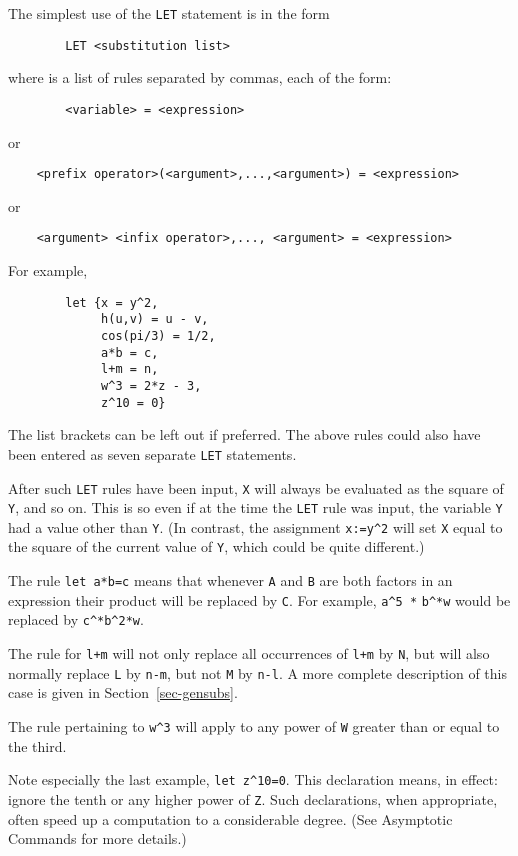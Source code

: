 The simplest use of the {\tt LET} statement is in the form
\begin{verbatim}
        LET <substitution list>
\end{verbatim}
where {\tt <substitution list>} is a list of rules separated by commas, each
of the form:
\begin{verbatim}
        <variable> = <expression>
\end{verbatim}
or
\begin{verbatim}
    <prefix operator>(<argument>,...,<argument>) = <expression>
\end{verbatim}
or
\begin{verbatim}
    <argument> <infix operator>,..., <argument> = <expression>
\end{verbatim}
For example,
\begin{verbatim}
        let {x = y^2,
             h(u,v) = u - v,
             cos(pi/3) = 1/2,
             a*b = c,
             l+m = n,
             w^3 = 2*z - 3,
             z^10 = 0}
\end{verbatim}
The list brackets can be left out if preferred.  The above rules could
also have been entered as seven separate {\tt LET} statements.

After such {\tt LET} rules have been input, {\tt X} will always be
evaluated as the square of {\tt Y}, and so on.  This is so even if at the
time the {\tt LET} rule was input, the variable {\tt Y} had a value other
than {\tt Y}. (In contrast, the assignment {\tt x:=y\^{ }2} will set {\tt X}
equal to the square of the current value of {\tt Y}, which could be quite
different.)

The rule {\tt let a*b=c} means that whenever {\tt A} and {\tt B} are both
factors in an expression their product will be replaced by {\tt C}.  For
example, {\tt a\^{ }5 *} {\tt b\^{ }*w} would be replaced by
{\tt c\^{ }*b\^{ }2*w}.

The rule for {\tt l+m} will not only replace all occurrences of {\tt l+m}
by {\tt N}, but will also normally replace {\tt L} by {\tt n-m}, but not
{\tt M} by {\tt n-l}.  A more complete description of this case is given
in Section~\ref{sec-gensubs}.

The rule pertaining to {\tt w\^{ }3} will apply to any power of {\tt W}
greater than or equal to the third.

Note especially the last example, {\tt let z\^{ }10=0}.  This declaration
means, in effect: ignore the tenth or any higher power of {\tt Z}.  Such
declarations, when appropriate, often speed up a computation to a
considerable degree. (See 
Asymptotic Commands for more details.)


